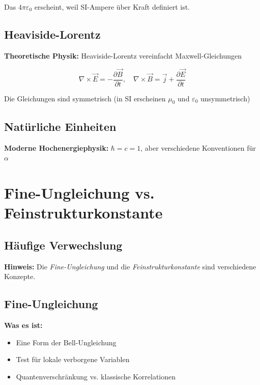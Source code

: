 	Das $4\pi\varepsilon_0$ erscheint, weil SI-Ampere über Kraft definiert ist.
	
	\subsection{Heaviside-Lorentz}
	
	\textbf{Theoretische Physik:} Heaviside-Lorentz vereinfacht Maxwell-Gleichungen
	
	\begin{equation}
		\nabla \times \vec{E} = -\frac{\partial \vec{B}}{\partial t}, \quad \nabla \times \vec{B} = \vec{j} + \frac{\partial \vec{E}}{\partial t}
	\end{equation}
	
	Die Gleichungen sind symmetrisch (in SI erscheinen $\mu_0$ und $\varepsilon_0$ unsymmetrisch)
	
	\subsection{Natürliche Einheiten}
	
	\textbf{Moderne Hochenergiephysik:} $\hbar = c = 1$, aber verschiedene Konventionen für $\alpha$
	
	\section{Fine-Ungleichung vs. Feinstrukturkonstante}
	
	\subsection{Häufige Verwechslung}
	
	\textbf{Hinweis:} Die \textit{Fine-Ungleichung} und die \textit{Feinstrukturkonstante} sind verschiedene Konzepte.
	
	\subsection{Fine-Ungleichung}
	
	\textbf{Was es ist:}
	\begin{itemize}
		\item Eine Form der Bell-Ungleichung
		\item Test für lokale verborgene Variablen
		\item Quantenverschränkung vs. klassische Korrelationen
	\end{itemize}
	
